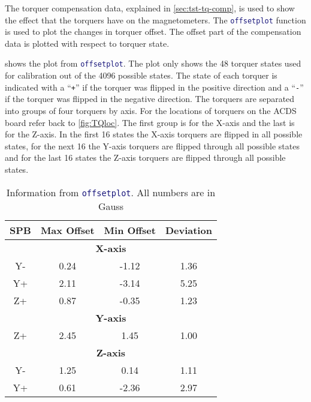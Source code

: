 The torquer compensation data, explained in \cref{sec:tst-tq-comp}, is used to show the effect that the torquers have on the magnetometers. The \lstinline[style=code,language=Matlab]$offsetplot$ function is used to plot the changes in torquer offset. The offset part of the compensation data is plotted with respect to torquer state.

 shows the plot from \lstinline[style=code,language=Matlab]$offsetplot$. The plot only shows the 48 torquer states used for calibration out of the 4096 possible states. The state of each torquer is indicated with a ``\texttt{+}'' if the torquer was flipped in the positive direction and a ``\texttt{-}'' if the torquer was flipped in the negative direction. The torquers are separated into groups of four torquers by axis. For the locations of torquers on the \ac{ACDS} board refer back to \cref{fig:TQloc}. The first group is for the X-axis and the last is for the Z-axis. In the first 16 states the X-axis torquers are flipped in all possible states, for the next 16 the Y-axis torquers are flipped through all possible states and for the last 16 states the Z-axis torquers are flipped through all possible states.

 
\begin{table}[!ht]
    \centering
    \caption{Information from \lstinline[style=code,language=Matlab]$offsetplot$. All numbers are in Gauss}
    \label{tab:off-stat}
    \begin{tabular}{|c|c|c|c|}
        \hline
        \acs{SPB}&Max Offset&Min Offset&Deviation\\
        \hline
        \multicolumn{4}{|c|}{\bfseries X-axis}\\
        \hline
        Y-&0.24&-1.12&1.36\\
        \hline
        Y+&2.11&-3.14&5.25\\
        \hline
        Z+&0.87&-0.35&1.23\\
        \hline
        \multicolumn{4}{|c|}{\bfseries Y-axis}\\
        \hline
        Z+&2.45&1.45&1.00\\
        \hline
        \multicolumn{4}{|c|}{\bfseries Z-axis}\\
        \hline
        Y-&1.25&0.14&1.11\\
        \hline
        Y+&0.61&-2.36&2.97\\
        \hline
    \end{tabular}
\end{table}

